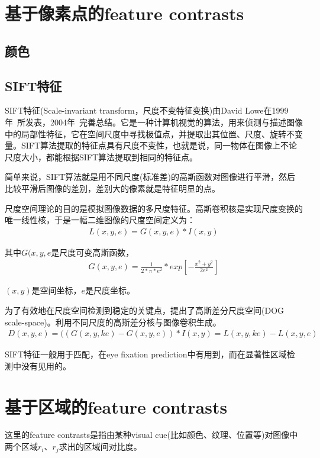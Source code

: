 \documentclass[12pt]{article}
\begin{document}
\section{基于像素点的feature contrasts}

\subsection{颜色}

\subsection{SIFT特征}

SIFT特征(Scale-invariant transform，尺度不变特征变换)由David Lowe在1999年~\cite{lowe1999object}所发表，2004年~\cite{lowe2004distinctive}完善总结。它是一种计算机视觉的算法，用来侦测与描述图像中的局部性特征，它在空间尺度中寻找极值点，并提取出其位置、尺度、旋转不变量。SIFT算法提取的特征点具有尺度不变性，也就是说，同一物体在图像上不论尺度大小，都能根据SIFT算法提取到相同的特征点。

简单来说，SIFT算法就是用不同尺度(标准差)的高斯函数对图像进行平滑，然后比较平滑后图像的差别，差别大的像素就是特征明显的点。

尺度空间理论的目的是模拟图像数据的多尺度特征。高斯卷积核是实现尺度变换的唯一线性核，于是一幅二维图像的尺度空间定义为：
\begin{align}
L(x, y, e) = G(x, y, e) * I(x, y)
\end{align}

其中$G(x, y, e$是尺度可变高斯函数，
\begin{align}
 G(x,y,e) = \frac{1}{2*\pi *e^2} * exp[-\frac{x^2 + y^2}{2e^2}]
\end{align}

$(x, y)$是空间坐标，$e$是尺度坐标。

为了有效地在尺度空间检测到稳定的关键点，提出了高斯差分尺度空间(DOG scale-space)。利用不同尺度的高斯差分核与图像卷积生成。
\begin{align}
D(x,y,e) = ((G(x,y,ke) - G(x,y,e)) * I(x,y) = L(x,y,ke) - L(x,y,e)
\end{align}

SIFT特征一般用于匹配，在eye fixation prediction中有用到，而在显著性区域检测中没有见用的。

\section{基于区域的feature contrasts}

这里的feature contrasts是指由某种visual cue(比如颜色、纹理、位置等)对图像中两个区域$r_i$、$r_j$求出的区域间对比度。
\end{document}
